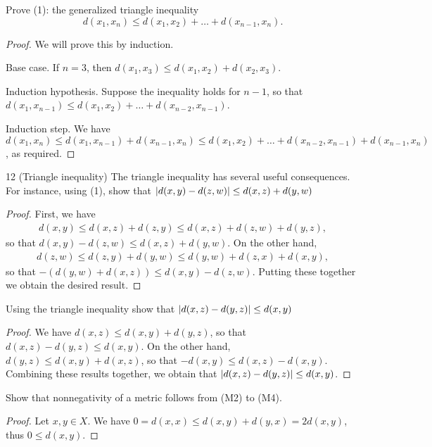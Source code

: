 \begin{exercise}{11}
Prove (1): the generalized triangle inequality
\[
d(x_1,x_n)\leq d(x_1,x_2)+\dots+d(x_{n-1},x_n).
\]
\end{exercise}
\begin{proof}
We will prove this by induction.

Base case. If $n=3$, then $d(x_1,x_3)\leq d(x_1,x_2)+d(x_2,x_3)$.

Induction hypothesis. Suppose the inequality holds for $n-1$, so that\\ $d(x_1,x_{n-1})\leq d(x_1,x_2)+\dots+d(x_{n-2},x_{n-1})$.

Induction step. We have $d(x_1,x_n)\leq d(x_1,x_{n-1})+d(x_{n-1},x_n)\leq d(x_1,x_2)+\dots+d(x_{n-2},x_{n-1})+d(x_{n-1},x_n)$, as required.
\end{proof}

\begin{exercise}{12 (Triangle inequality)}
The triangle inequality has several useful consequences. For instance, using (1), show that $\left\lvert d(x,y)-d(z,w)\right\rvert\leq d(x,z)+d(y,w)$
\end{exercise}
\begin{proof}
First, we have
\begin{align*}
    d(x,y) \leq d(x,z)+d(z,y) \leq d(x,z)+d(z,w)+d(y,z),
\end{align*}
so that $d(x,y)-d(z,w)\leq d(x,z)+d(y,w)$. On the other hand,
\begin{align*}
    d(z,w) \leq d(z,y)+d(y,w) \leq d(y,w)+d(z,x)+d(x,y),
\end{align*}
so that $-(d(y,w)+d(x,z))\leq d(x,y)-d(z,w)$. Putting these together we obtain the desired result.
\end{proof}

\begin{exercise}{13}
Using the triangle inequality show that $\left\lvert d(x,z)-d(y,z)\right\rvert\leq d(x,y)$
\end{exercise}
\begin{proof}
We have $d(x,z)\leq d(x,y)+d(y,z)$, so that $d(x,z)-d(y,z)\leq d(x,y)$. On the other hand, $d(y,z)\leq d(x,y)+d(x,z)$, so that $-d(x,y)\leq d(x,z)-d(x,y)$. Combining these results together, we obtain that $\left\lvert d(x,z)-d(y,z)\right\rvert\leq d(x,y)$.
\end{proof}

\begin{exercise}{15}
Show that nonnegativity of a metric follows from (M2) to (M4).
\end{exercise}
\begin{proof}
Let $x,y\in X$. We have $0=d(x,x)\leq d(x,y)+d(y,x)=2d(x,y)$, thus $0\leq d(x,y)$.
\end{proof}
